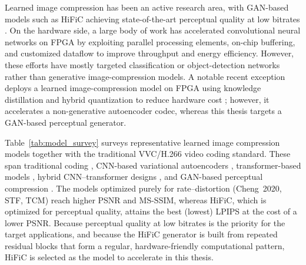 Learned image compression has been an active research area, with GAN-based models such as HiFiC achieving state-of-the-art perceptual quality at low bitrates \cite{mentzer2020high}. On the hardware side, a large body of work has accelerated convolutional neural networks on FPGA by exploiting parallel processing elements, on-chip buffering, and customized dataflow to improve throughput and energy efficiency. However, these efforts have mostly targeted classification or object-detection networks rather than generative image-compression models. A notable recent exception deploys a learned image-compression model on FPGA using knowledge distillation and hybrid quantization to reduce hardware cost \cite{mazouz2025lightweight}; however, it accelerates a non-generative autoencoder codec, whereas this thesis targets a GAN-based perceptual generator.

Table~\ref{tab:model_survey} surveys representative learned image compression models together with the traditional VVC/H.266 video coding standard. These span traditional coding \cite{bross2021vvc}, CNN-based variational autoencoders \cite{cheng2020learned}, transformer-based models \cite{zou2022stf}, hybrid CNN--transformer designs \cite{liu2023tcm}, and GAN-based perceptual compression \cite{mentzer2020high}. The models optimized purely for rate--distortion (Cheng~2020, STF, TCM) reach higher PSNR and MS-SSIM, whereas HiFiC, which is optimized for perceptual quality, attains the best (lowest) LPIPS at the cost of a lower PSNR. Because perceptual quality at low bitrates is the priority for the target applications, and because the HiFiC generator is built from repeated residual blocks that form a regular, hardware-friendly computational pattern, HiFiC is selected as the model to accelerate in this thesis.

